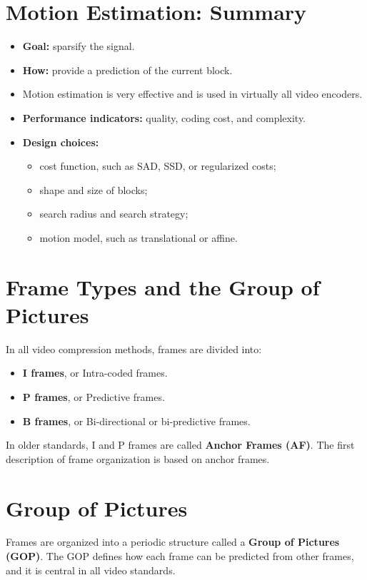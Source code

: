 \section{Motion Estimation: Summary}

\begin{itemize}
\item \textbf{Goal:} sparsify the signal.
\item \textbf{How:} provide a prediction of the current block.
\item Motion estimation is very effective and is used in virtually all video encoders.
\item \textbf{Performance indicators:} quality, coding cost, and complexity.
\item \textbf{Design choices:}
\begin{itemize}
\item cost function, such as SAD, SSD, or regularized costs;
\item shape and size of blocks;
\item search radius and search strategy;
\item motion model, such as translational or affine.
\end{itemize}
\end{itemize}

\section{Frame Types and the Group of Pictures}

In all video compression methods, frames are divided into:

\begin{itemize}
\item \textbf{I frames}, or Intra-coded frames.
\item \textbf{P frames}, or Predictive frames.
\item \textbf{B frames}, or Bi-directional or bi-predictive frames.
\end{itemize}

In older standards, I and P frames are called \textbf{Anchor Frames (AF)}. The first description of frame organization is based on anchor frames.

\section{Group of Pictures}

Frames are organized into a periodic structure called a \textbf{Group of Pictures (GOP)}. The GOP defines how each frame can be predicted from other frames, and it is central in all video standards.

